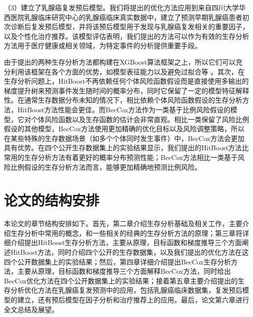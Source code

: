 （3）建立了乳腺癌复发预后模型。我们将提出的优化方法应用到来自四川大学华西医院乳腺临床研究中心的乳腺癌临床真实数据中，建立了预测早期乳腺癌患者初次诊断后复发预后模型，并将该预后模型用于发现与乳腺癌复发相关的重要因子，以及个性化治疗推荐。该模型评估表明，我们提出的方法可以作为有效的生存分析方法用于医疗健康或相关领域，为特定事件的分析提供重要手段。

由于提出的两种生存分析方法都构建在XGBoost算法框架之上，所以它们可以充分利用该框架在各个方面的优势，如模型表征能力以及避免过拟合等 。其次，在生存分析问题上，HitBoost不再依赖任何个体风险函数假设而是直接使用多输出的梯度提升树来预测事件发生随时间的概率分布，同时它保留了一定的模型特征解释性。在通常生存数据分布未知的情况下，相比依赖个体风险函数假设的生存分析方法，HitBoost方法性能会更佳。而BecCox方法作为一类基于比例风险假设的模型，它对个体风险函数以及生存函数的估计会非常直观。相比一类保留了风险比例假设的其他模型，BecCox方法使用更加精确的优化目标以及风险调整策略，所以在某些特殊的生存数据场景（如多个个体同时发生事件）中，BecCox方法会更加具有优势。在四个公开生存数据集上的实验结果显示，我们提出的HitBoost方法比常用的生存分析方法有着更好的概率分布预测性能；BecCox方法相比一类基于风险比例假设的生存分析方法而言，能够更加精确地预测比例风险。

\section{论文的结构安排}

本论文的章节结构安排如下。首先，第二章介绍生存分析基础及相关工作，主要介绍生存分析中常用的概念，和一些相关的经典的生存分析方法的原理；第三章将详细介绍提出HitBoost生存分析方法，主要从原理，目标函数和梯度推导三个方面阐述HitBoost方法，同时介绍四个公开的生存数据集，以及我们提出的优化方法在这四个公开数据集上的实验结果；然后，第四章详细介绍提出BecCox生存分析方法，主要从原理，目标函数和梯度推导三个方面解释BecCox方法，同时给出BecCox优化方法在四个公开数据集上的实验结果；接着第五章主要介绍提出的生存分析优化方法在乳腺癌复发预测中的应用，包括乳腺癌临床数据集，复发预后模型的建立，还有预后模型在因子分析和治疗推荐上的应用。最后，论文第六章进行全文总结及展望。
